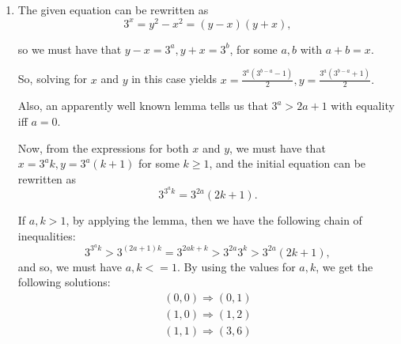 \documentclass{article}
\begin{document}
\begin{enumerate}
\item The given equation can be rewritten as
$$
	3^x = y^2 - x^2 = (y - x)(y + x),
$$

so we must have that $ y - x = 3^a, y + x = 3^b$, for some $a, b$ with
$a + b = x.$

So, solving for $x$ and $y$ in this case yields
$x = \frac{3^a(3^{b - a} - 1)}{2}, y = \frac{3^a(3^{b - a} + 1)}{2}.$

Also, an apparently well known lemma tells us that $3^a > 2a + 1$ with equality
iff $a = 0$.

Now, from the expressions for both $x$ and $y$, we must have that
$x = 3^ak,y = 3^a(k + 1)$ for some $k \geq 1$, and the initial
equation can be rewritten as
$$
	3^{3^ak} = 3^{2a}(2k + 1).
$$

If $a, k > 1$, by applying the lemma, then we have the following chain
of inequalities:
$$
	3^{3^ak} > 3^{(2a + 1)k} = 3^{2ak + k} > 3^{2a} 3^k > 3^{2a}(2k + 1),
$$
and so, we must have $a, k <= 1.$ By using the values for $a, k$, we get
the following solutions:
\begin{eqnarray*}
	(0, 0) \Rightarrow (0, 1) \\
	(1, 0) \Rightarrow (1, 2) \\
	(1, 1) \Rightarrow (3, 6) \\
\end{eqnarray*}

\end{enumerate}
\end{document}
